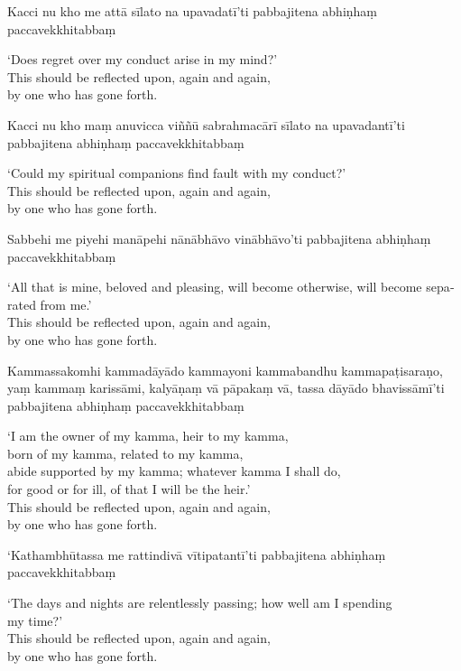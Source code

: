 Kacci nu kho me attā sīlato na upavadatī'ti pabbajitena abhiṇhaṃ paccavekkhitabbaṃ

\begin{english}
  `Does regret over my conduct arise in my mind?'\\
  This should be reflected upon, again and again,\\
  by one who has gone forth.
\end{english}

Kacci nu kho maṃ anuvicca viññū sabrahmacārī sīlato na upavadantī'ti pabbajitena abhiṇhaṃ paccavekkhitabbaṃ

\begin{english}
  `Could my spiritual companions find fault with my conduct?'\\
  This should be reflected upon, again and again,\\
  by one who has gone forth.
\end{english}

Sabbehi me piyehi manāpehi nānābhāvo vinābhāvo'ti pabbajitena abhiṇhaṃ paccavekkhitabbaṃ

\begin{english}
  `All that is mine, beloved and pleasing, will become otherwise, will become separated from me.'\\
  This should be reflected upon, again and again,\\
  by one who has gone forth.
\end{english}

Kammassakomhi kammadāyādo kammayoni kammabandhu kammapaṭisaraṇo, yaṃ kammaṃ karissāmi, kalyāṇaṃ vā pāpakaṃ vā, tassa dāyādo bhavissāmī'ti pabbajitena abhiṇhaṃ paccavekkhitabbaṃ

\begin{english}
  `I am the owner of my kamma, heir to my kamma,\\
  born of my kamma, related to my kamma,\\
  abide supported by my kamma; whatever kamma I shall do,\\
  for good or for ill, of that I will be the heir.'\\
  This should be reflected upon, again and again,\\
  by one who has gone forth.
\end{english}

`Kathambhūtassa me rattindivā vītipatantī'ti pabbajitena abhiṇhaṃ paccavekkhitabbaṃ

\begin{english}
  `The days and nights are relentlessly passing; how well am I spending\\ my time?'\\
  This should be reflected upon, again and again,\\
  by one who has gone forth.
\end{english}


